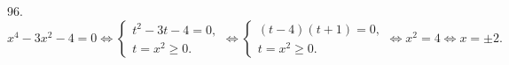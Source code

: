 96. $x^4-3x^2-4=0\Leftrightarrow \begin{cases}t^2-3t-4=0,\\ t=x^2\geqslant0.\end{cases}\Leftrightarrow
\begin{cases}(t-4)(t+1)=0,\\ t=x^2\geqslant0.\end{cases}\Leftrightarrow x^2=4 \Leftrightarrow x=\pm2.$\\
